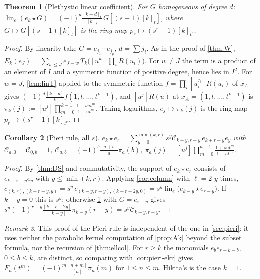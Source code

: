 \documentclass[11pt]{amsart}
\newtheorem{theorem}{Theorem}[section]
\newtheorem{corollary}[theorem]{Corollary}
\theoremstyle{definition}
\theoremstyle{remark}
\newtheorem{remark}[theorem]{Remark}
\numberwithin{equation}{section}
\newcommand{\lin}{\operatorname{lin}_e}
\begin{document}
\begin{theorem}[Plethystic linear coefficient]\label{thm:lin}
For $G$ homogeneous of degree $d$: $\lin(e_k\star G)=(-1)^d\frac{[k+d]_t}{[k]_t}\,G[(s-1)[k]_t]$, where $G\mapsto G[(s-1)[k]_t]$ is the ring map $p_r\mapsto(s^r-1)[k]_{t^r}$.
\end{theorem}
\begin{proof}
By linearity take $G=e_{j_1}\cdots e_{j_p}$, $d=\sum j_i$. As in the proof of \cref{thm:W}, $E_k(e_J)=\sum_{w\le J}e_{J-w}\,T_k\bigl([u^w]\prod_iR(u_i)\bigr)$. For $w\ne J$ the term is a product of an element of $I$ and a symmetric function of positive degree, hence lies in $I^2$. For $w=J$, \cref{lem:linT} applied to the symmetric function $f=\prod_i[u_i^{j_i}]R(u_i)$ of $x_A$ gives $(-1)^d\frac{[k+d]}{[k]}f(1,t,\dots,t^{k-1})$, and $[u^j]R(u)$ at $x_A=(1,t,\dots,t^{k-1})$ is $\pi_k(j):=[u^j]\prod_{m=0}^{k-1}\frac{1+sut^m}{1+ut^m}$. Taking logarithms, $e_j\mapsto\pi_k(j)$ is the ring map $p_r\mapsto(s^r-1)[k]_{t^r}$.
\end{proof}
\begin{corollary}[Pieri rule, all $s$]\label{cor:pieri}
$e_k\star e_r=\sum_{y=0}^{\min(k,r)}s^y\mathcal C_{k-y,r-y}\,e_{k+r-y}e_y$ with $\mathcal C_{a,0}=\mathcal C_{0,b}=1$, $\mathcal C_{a,b}=(-1)^b\frac{[a+b]}{[a]}\pi_a(b)$, $\pi_a(j)=[u^j]\prod_{m=0}^{a-1}\frac{1+sut^m}{1+ut^m}$.
\end{corollary}
\begin{proof}
By \cref{thm:DS} and commutativity, the support of $e_k\star e_r$ consists of $e_{k+r-y}e_y$ with $y\le\min(k,r)$. Applying \cref{cor:column} with $\ell=2$ $y$ times, $c_{(k,r),(k+r-y,y)}=s^y\,c_{(k-y,r-y),(k+r-2y,0)}=s^y\lin\bigl(e_{k-y}\star e_{r-y}\bigr)$. If $k-y=0$ this is $s^y$; otherwise \cref{thm:lin} with $G=e_{r-y}$ gives $s^y(-1)^{r-y}\frac{[k+r-2y]}{[k-y]}\pi_{k-y}(r-y)=s^y\mathcal C_{k-y,r-y}$.
\end{proof}
\begin{remark}
This proof of the Pieri rule is independent of the one in \cref{sec:pieri}: it uses neither the parabolic kernel computation of \cref{prop:Ak} beyond the subset formula, nor the recursion of \cref{thm:ellcol}. For $r\ge k$ the monomials $e_be_{r+k-b}$, $0\le b\le k$, are distinct, so comparing with \cref{cor:pieri-ekr} gives $F_n(t^m)=(-1)^m\frac{[n+m]}{[n]}\pi_n(m)$ for $1\le n\le m$. Hikita's \cite[Thm.~3.12]{Hikita25} is the case $k=1$.
\end{remark}


\end{document}
